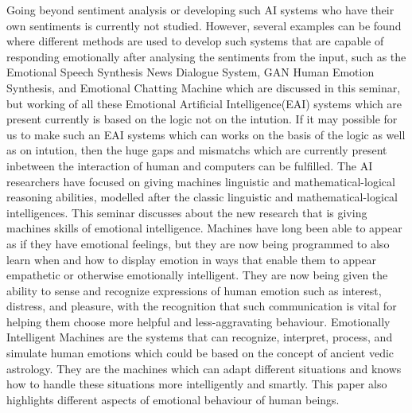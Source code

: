 Going beyond sentiment analysis or developing such AI systems who have their own sentiments is currently not studied. However, several examples can be found where different methods are used to develop such systems that are capable of responding emotionally after analysing the sentiments from the input, such as the Emotional Speech Synthesis News Dialogue System, GAN Human Emotion Synthesis, and Emotional Chatting Machine which are discussed in this seminar, but working of all these Emotional Artificial Intelligence(EAI) systems which are present currently is based on the logic not on the intution. If it may possible for us to make such an EAI systems which can works on the basis of the logic as well as on intution, then the huge gaps and mismatchs which are currently present inbetween the interaction of human and computers can be fulfilled. The AI researchers have focused on giving machines linguistic and mathematical-logical reasoning abilities, modelled after the classic linguistic and mathematical-logical intelligences. This seminar discusses about the new research that is giving machines skills of emotional intelligence. Machines have long been able to appear as if they have emotional feelings, but they are now being programmed to also learn when and how to display emotion in ways that enable them to appear empathetic or otherwise emotionally intelligent. They are now being given the ability to sense and recognize expressions of human emotion such as interest, distress, and pleasure, with the recognition that such communication is vital for helping them choose more helpful and less-aggravating behaviour. Emotionally Intelligent Machines are the systems that can recognize, interpret, process, and simulate human emotions which could be based on the concept of ancient vedic astrology. They are the machines which can adapt different situations and knows how to handle these situations more intelligently and smartly. This paper also highlights different aspects of emotional behaviour of human beings.